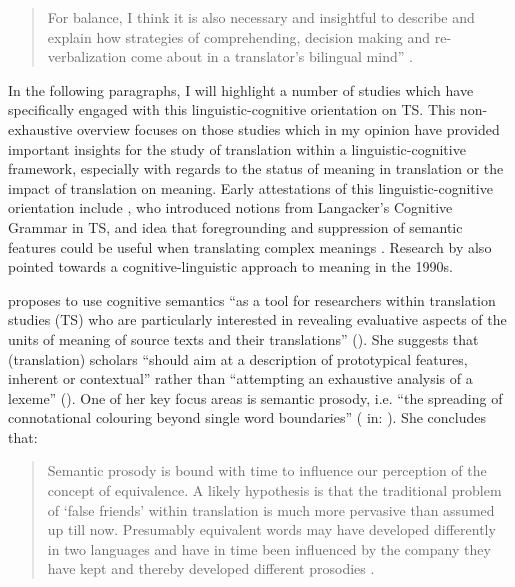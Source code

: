 \begin{quote}
For balance, I think it is also necessary and insightful to describe and explain how strategies of comprehending, decision making and re-verbalization come about in a translator’s bilingual mind” \citep[46]{house_towards_2013}. 
\end{quote}

In the following paragraphs, I will highlight a number of studies which have specifically engaged with this linguistic-cognitive orientation on TS. This non-exhaustive overview focuses on those studies which in my opinion have provided important insights for the study of translation within a linguistic-cognitive framework, especially with regards to the status of meaning in translation or the impact of translation on meaning. Early attestations of this linguistic-cognitive orientation include \citet{tabakowska_cognitive_1993}, who introduced notions from Langacker’s Cognitive Grammar in TS, and  idea that foregrounding and suppression of semantic features could be useful when translating complex meanings \citep[8]{rojo_cognitive_2013}. Research by \citet{wilss_knowledge_1996} also pointed towards a cognitive-linguistic approach to meaning in the 1990s.

\citeyear{korning_zethsen_corpus-based_2008} proposes to use cognitive semantics “as a tool for researchers within translation studies (TS) who are particularly interested in revealing evaluative aspects of the units of meaning of source texts and their translations” (\citeyear[249]{korning_zethsen_corpus-based_2008}). She suggests that (translation) scholars “should aim at a description of prototypical features, inherent or contextual” rather than “attempting an exhaustive analysis of a lexeme” (\citeyear[251]{korning_zethsen_corpus-based_2008}). One of her key focus areas is semantic prosody, i.e. “the spreading of connotational colouring beyond single word boundaries” (\citealt[68]{partington_patterns_1998} in: \citealt[256]{korning_zethsen_corpus-based_2008}). She concludes that:

\begin{quote}
Semantic prosody is bound with time to influence our perception of the concept of equivalence. A likely hypothesis is that the traditional problem of ‘false friends’ within translation is much more pervasive than assumed up till now. Presumably equivalent words may have developed differently in two languages and have in time been influenced by the company they have kept and thereby developed different prosodies \citep[258]{korning_zethsen_corpus-based_2008}.
\end{quote}


